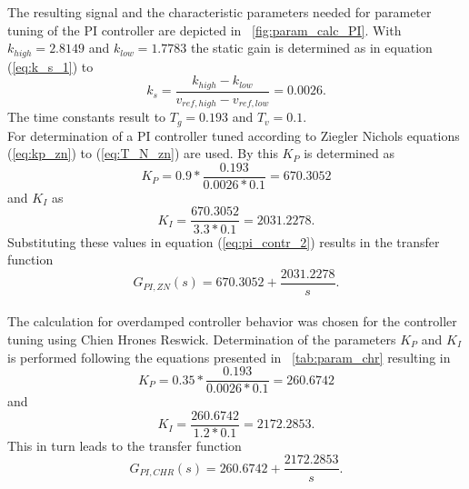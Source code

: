 The resulting signal and the characteristic parameters needed for parameter tuning of the PI controller are depicted in \figurename~\ref{fig:param_calc_PI}. With $k_{high}=2.8149$ and $k_{low}=1.7783$ the static gain is determined as in equation (\ref{eq:k_s_1}) to
\begin{equation}
  k_s = \frac{k_{high}-k_{low}}{v_{ref,high}-v_{ref,low}}= 0.0026.
\label{eq:k_s_2}
\end{equation}
The time constants result to $T_g=0.193$ and $T_v=0.1$.
\\For determination of a PI controller tuned according to Ziegler Nichols equations (\ref{eq:kp_zn}) to (\ref{eq:T_N_zn}) are used. By this $K_{P}$ is determined as
\begin{equation}
  K_{P} = 0.9*\frac{0.193}{0.0026*0.1}=670.3052
\end{equation}
and $K_I$ as
\begin{equation}
  K_{I}  = \frac{670.3052}{3.3*0.1}=2031.2278.
\end{equation}
Substituting these values in equation (\ref{eq:pi_contr_2}) results in the transfer function
\begin{equation}
  G_{PI,ZN}(s)=670.3052+\frac{2031.2278}{s}.
\end{equation}
\\The calculation for overdamped controller behavior was chosen for the controller tuning using Chien Hrones Reswick. Determination of the parameters $K_P$ and $K_I$ is performed following the equations presented in \tablename~\ref{tab:param_chr} resulting in
\begin{equation}
  K_P = 0.35*\frac{0.193}{0.0026*0.1}=260.6742
\end{equation}
and
\begin{equation}
  K_I = \frac{260.6742}{1.2*0.1}=2172.2853.
\end{equation}
This in turn leads to the transfer function
\begin{equation}
  G_{PI,CHR}(s)=260.6742+\frac{2172.2853}{s}.
\end{equation}
